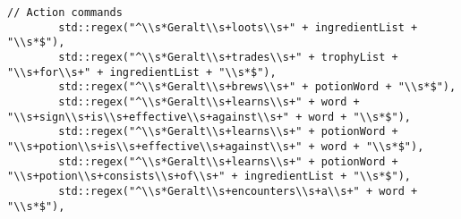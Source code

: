 \documentclass[a4paper,12pt]{article}
\begin{document}
\begin{lstlisting}[style=CStyle]
        // Action commands
        std::regex("^\\s*Geralt\\s+loots\\s+" + ingredientList + "\\s*$"),
        std::regex("^\\s*Geralt\\s+trades\\s+" + trophyList + "\\s+for\\s+" + ingredientList + "\\s*$"),
        std::regex("^\\s*Geralt\\s+brews\\s+" + potionWord + "\\s*$"),
        std::regex("^\\s*Geralt\\s+learns\\s+" + word + "\\s+sign\\s+is\\s+effective\\s+against\\s+" + word + "\\s*$"),
        std::regex("^\\s*Geralt\\s+learns\\s+" + potionWord + "\\s+potion\\s+is\\s+effective\\s+against\\s+" + word + "\\s*$"),
        std::regex("^\\s*Geralt\\s+learns\\s+" + potionWord + "\\s+potion\\s+consists\\s+of\\s+" + ingredientList + "\\s*$"),
        std::regex("^\\s*Geralt\\s+encounters\\s+a\\s+" + word + "\\s*$"),


\end{lstlisting}
\end{document}

